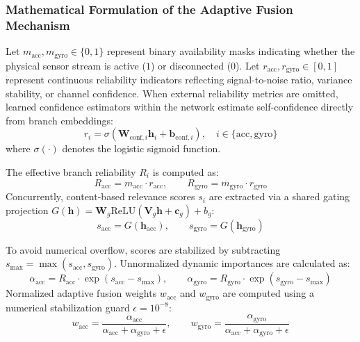 \subsubsection{Mathematical Formulation of the Adaptive Fusion Mechanism}
Let $m_{\text{acc}}, m_{\text{gyro}} \in \{0, 1\}$ represent binary availability masks indicating whether the physical sensor stream is active ($1$) or disconnected ($0$). Let $r_{\text{acc}}, r_{\text{gyro}} \in [0, 1]$ represent continuous reliability indicators reflecting signal-to-noise ratio, variance stability, or channel confidence. When external reliability metrics are omitted, learned confidence estimators within the network estimate self-confidence directly from branch embeddings:
\begin{equation}
    r_i = \sigma(\mathbf{W}_{\text{conf}, i} \mathbf{h}_i + \mathbf{b}_{\text{conf}, i}), \quad i \in \{\text{acc}, \text{gyro}\}
\end{equation}
where $\sigma(\cdot)$ denotes the logistic sigmoid function.

The effective branch reliability $R_i$ is computed as:
\begin{equation}
    R_{\text{acc}} = m_{\text{acc}} \cdot r_{\text{acc}}, \qquad R_{\text{gyro}} = m_{\text{gyro}} \cdot r_{\text{gyro}}
\end{equation}
Concurrently, content-based relevance scores $s_i$ are extracted via a shared gating projection $G(\mathbf{h}) = \mathbf{W}_g \text{ReLU}(\mathbf{V}_g \mathbf{h} + \mathbf{c}_g) + b_g$:
\begin{equation}
    s_{\text{acc}} = G(\mathbf{h}_{\text{acc}}), \qquad s_{\text{gyro}} = G(\mathbf{h}_{\text{gyro}})
\end{equation}

To avoid numerical overflow, scores are stabilized by subtracting $s_{\max} = \max(s_{\text{acc}}, s_{\text{gyro}})$. Unnormalized dynamic importances are calculated as:
\begin{equation}
    \alpha_{\text{acc}} = R_{\text{acc}} \cdot \exp(s_{\text{acc}} - s_{\max}), \qquad \alpha_{\text{gyro}} = R_{\text{gyro}} \cdot \exp(s_{\text{gyro}} - s_{\max})
\end{equation}
Normalized adaptive fusion weights $w_{\text{acc}}$ and $w_{\text{gyro}}$ are computed using a numerical stabilization guard $\epsilon = 10^{-8}$:
\begin{equation}
    w_{\text{acc}} = \frac{\alpha_{\text{acc}}}{\alpha_{\text{acc}} + \alpha_{\text{gyro}} + \epsilon}, \qquad w_{\text{gyro}} = \frac{\alpha_{\text{gyro}}}{\alpha_{\text{acc}} + \alpha_{\text{gyro}} + \epsilon}
\end{equation}

